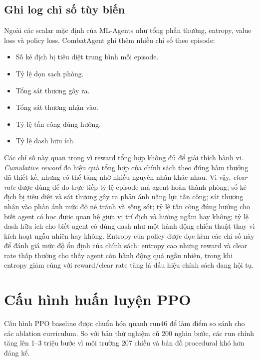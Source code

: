 \subsection{Ghi log chỉ số tùy biến}

Ngoài các scalar mặc định của ML-Agents như tổng phần thưởng, entropy, value loss và policy loss, CombatAgent ghi thêm nhiều chỉ số theo episode:

\begin{itemize}
    \item Số kẻ địch bị tiêu diệt trung bình mỗi episode.
    \item Tỷ lệ dọn sạch phòng.
    \item Tổng sát thương gây ra.
    \item Tổng sát thương nhận vào.
    \item Tỷ lệ tấn công đúng hướng.
    \item Tỷ lệ dash hữu ích.
\end{itemize}

Các chỉ số này quan trọng vì reward tổng hợp không đủ để giải thích hành vi. \textit{Cumulative reward} đo hiệu quả tổng hợp của chính sách theo đúng hàm thưởng đã thiết kế, nhưng có thể tăng nhờ nhiều nguyên nhân khác nhau. Vì vậy, \textit{clear rate} được dùng để đo trực tiếp tỷ lệ episode mà agent hoàn thành phòng; số kẻ địch bị tiêu diệt và sát thương gây ra phản ánh năng lực tấn công; sát thương nhận vào phản ánh mức độ né tránh và sống sót; tỷ lệ tấn công đúng hướng cho biết agent có học được quan hệ giữa vị trí địch và hướng ngắm hay không; tỷ lệ dash hữu ích cho biết agent có dùng dash như một hành động chiến thuật thay vì kích hoạt ngẫu nhiên hay không. Entropy của policy được đọc kèm các chỉ số này để đánh giá mức độ ổn định của chính sách: entropy cao nhưng reward và clear rate thấp thường cho thấy agent còn hành động quá ngẫu nhiên, trong khi entropy giảm cùng với reward/clear rate tăng là dấu hiệu chính sách đang hội tụ.

\section{Cấu hình huấn luyện PPO}

Cấu hình PPO baseline được chuẩn hóa quanh run46 để làm điểm so sánh cho các ablation curriculum. So với bản thử nghiệm cũ 200 nghìn bước, các run chính tăng lên 1--3 triệu bước vì môi trường 207 chiều và bản đồ procedural khó hơn đáng kể.

